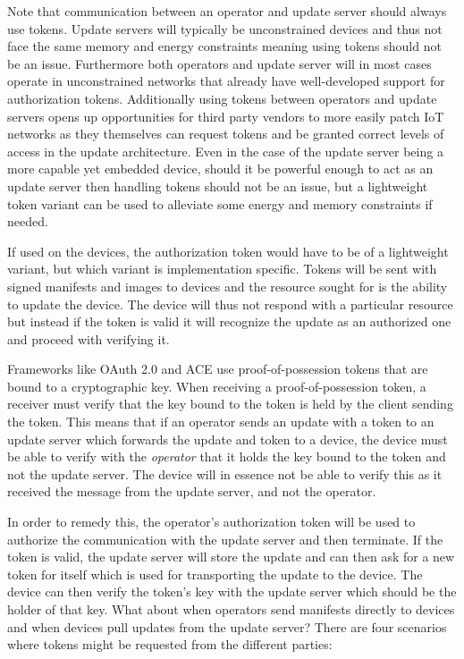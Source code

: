 \documentclass[0-thesis.tex]{subfiles}
\begin{document}
Note that communication between an operator and update server should always use tokens.
Update servers will typically be unconstrained devices and thus not face the same memory
and energy constraints meaning using tokens should not be an issue. Furthermore both
operators and update server will in most cases operate in unconstrained networks that
already have well-developed support for authorization tokens. Additionally using tokens
between operators and update servers opens up opportunities for third party vendors to
more easily patch IoT networks as they themselves can request tokens and be granted
correct levels of access in the update architecture. Even in the case of the update server
being a more capable yet embedded device, should it be powerful enough to act as an update
server then handling tokens should not be an issue, but a lightweight token variant can be
used to alleviate some energy and memory constraints if needed.

If used on the devices, the authorization token would have to be of a lightweight variant,
but which variant is implementation specific. Tokens will be sent with signed manifests
and images to devices and the resource sought for is the ability to update the device. The
device will thus not respond with a particular resource but instead if the token is valid
it will recognize the update as an authorized one and proceed with verifying it.

Frameworks like OAuth 2.0 and ACE use proof-of-possession tokens that are bound to a
cryptographic key. When receiving a proof-of-possession token, a receiver must verify that
the key bound to the token is held by the client sending the token. This means that if an
operator sends an update with a token to an update server which forwards the update and
token to a device, the device must be able to verify with the \textit{operator} that it
holds the key bound to the token and not the update server. The device will in essence not
be able to verify this as it received the message from the update server, and not the
operator.

In order to remedy this, the operator's authorization token will be used to authorize the
communication with the update server and then terminate. If the token is valid, the update
server will store the update and can then ask for a new token for itself which is used for
transporting the update to the device. The device can then verify the token's key with the
update server which should be the holder of that key. What about when operators send
manifests directly to devices and when devices pull updates from the update server? There
are four scenarios where tokens might be requested from the different parties:
\end{document}
